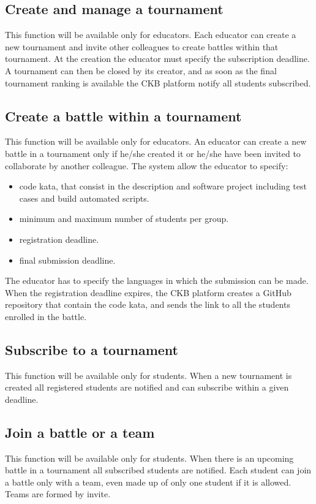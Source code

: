 \subsection{Create and manage a tournament}
This function will be available only for educators. \newline
Each educator can create a new tournament and invite other colleagues to create battles within that tournament. At the creation the educator must specify the subscription deadline. 
A tournament can then be closed by its creator, and as soon as the final tournament ranking is available the CKB platform notify all students subscribed.

\subsection{Create a battle within a tournament}
This function will be available only for educators. \newline 
An educator can create a new battle in a tournament only if he/she created it or he/she have been invited to collaborate by another colleague.
The system allow the educator to specify: 
\begin{itemize}
    \item code kata, that consist in the description and software project including test cases and build automated scripts.
    \item minimum and maximum number of students per group.
    \item registration deadline.
    \item final submission deadline.
\end{itemize}
The educator has to specify the languages in which the submission can be made.
When the registration deadline expires, the CKB platform creates a GitHub repository that contain the code kata, and sends the link to all the students enrolled in the battle.

\subsection{Subscribe to a tournament}
This function will be available only for students. \newline When a new tournament is created all registered students are notified and can subscribe within a given deadline.

\subsection{Join a battle or a team}
This function will be available only for students. \newline When there is an upcoming battle in a tournament all subscribed students are notified. Each student can join a battle only with a team, even made up of only one student if it is allowed. Teams are formed by invite.

